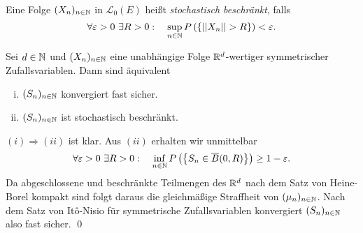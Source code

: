\begin{mydef}
    Eine Folge $(X_n)_{n \in \mathbb{N}}$ in $\mathcal{L}_0(E)$ heißt \textit{stochastisch beschränkt}, falls
    $$
        \forall \varepsilon >0 \ \exists R > 0: \quad \sup_{n \in \mathbb{N}}P\left(\left\{ \lvert\lvert X_n \rvert\rvert > R \right\}\right) < \varepsilon. 
    $$
\end{mydef}

\begin{corollary}
    Sei $d \in \mathbb{N}$ und $(X_n)_{n \in \mathbb{N}}$ eine unabhängige Folge $\mathbb{R}^d$-wertiger symmetrischer Zufallsvariablen. Dann sind äquivalent 
    \begin{enumerate}[(i)]
        \item $(S_n)_{n \in \mathbb{N}}$ konvergiert fast sicher.
        \item $(S_n)_{n \in \mathbb{N}}$ ist stochastisch beschränkt. 
    \end{enumerate} 
\end{corollary}
\begin{proof*}
    $(i) \Rightarrow (ii)$ ist klar. Aus $(ii)$ erhalten wir unmittelbar
    $$
        \forall \varepsilon > 0 \ \exists R > 0: \quad \inf_{n \in \mathbb{N}}P\left(\left\{ S_n \in \overline{B}(0,R) \right\}\right) \geq 1 - \varepsilon.
    $$
    Da abgeschlossene und beschränkte Teilmengen des $\mathbb{R}^d$ nach dem Satz von Heine-Borel kompakt sind folgt daraus die gleichmäßige Straffheit von $(\mu_n)_{n \in \mathbb{N}}$. 
    Nach dem Satz von Itô-Nisio für symmetrische Zufallsvariablen konvergiert $(S_n)_{n \in \mathbb{N}}$ also fast sicher. \qed 
\end{proof*}